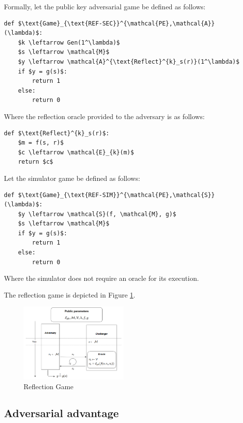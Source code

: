 Formally, let the public key adversarial game be defined as follows:

\begin{lstlisting}[texcl,mathescape,basicstyle=\small]
def $\text{Game}_{\text{REF-SEC}}^{\mathcal{PE},\mathcal{A}}(\lambda)$:
    $k \leftarrow Gen(1^\lambda)$
    $s \leftarrow \mathcal{M}$
    $y \leftarrow \mathcal{A}^{\text{Reflect}^{k}_s(r)}(1^\lambda)$
    if $y = g(s)$:
        return 1
    else:
        return 0
\end{lstlisting}

Where the reflection oracle provided to the adversary is as follows:

\begin{lstlisting}[texcl,mathescape,basicstyle=\small]
def $\text{Reflect}^{k}_s(r)$:
    $m = f(s, r)$
    $c \leftarrow \mathcal{E}_{k}(m)$
    return $c$
\end{lstlisting}

Let the simulator game be defined as follows:

\begin{lstlisting}[texcl,mathescape,basicstyle=\small]
def $\text{Game}_{\text{REF-SIM}}^{\mathcal{PE},\mathcal{S}}(\lambda)$:
    $y \leftarrow \mathcal{S}(f, \mathcal{M}, g)$
    $s \leftarrow \mathcal{M}$
    if $y = g(s)$:
        return 1
    else:
        return 0
\end{lstlisting}

Where the simulator does not require an oracle for its execution.

The reflection game is depicted in Figure \ref{fig:refgame}.

    \begin{figure}[thpb]
        \centering
            \includegraphics[width=0.48\textwidth]{figures/reflection_game.png}
        \caption{Reflection Game}
        \label{fig:refgame}
    \end{figure}

\subsection{Adversarial advantage}\label{subsec:refsecadv}


